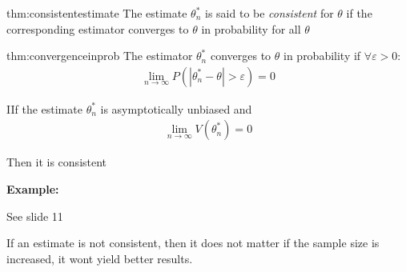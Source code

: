 \newpage
\begin{theo}{thm:consistentestimate}
  The estimate $\theta_n^*$ is said to be \textit{consistent} for $\theta$ if the corresponding estimator converges to $\theta$ in probability for all $\theta$
\end{theo}
\par\bigskip
\begin{theo}{thm:convergenceinprob}
  The estimator $\theta_n^*$ converges to $\theta$ in probability if $\forall \varepsilon>0$:
  \begin{equation*}
    \begin{gathered}
      \lim_{n\to\infty} P(\left|\theta_n^*-\theta\right|>\varepsilon)=0
    \end{gathered}
  \end{equation*}
\end{theo}
\par\bigskip
\begin{theo}
  IIf the estimate $\theta_n^*$ is asymptotically unbiased and
  \begin{equation*}
    \begin{gathered}
      \lim_{n\to\infty} V(\theta_n^*) = 0
    \end{gathered}
  \end{equation*}\par
  \noindent Then it is consistent
\end{theo}
\par\bigskip
\noindent\textbf{Example:}\par
\noindent See slide 11
\par\bigskip
\noindent If an estimate is not consistent, then it does not matter if the sample size is increased, it wont yield better results.

